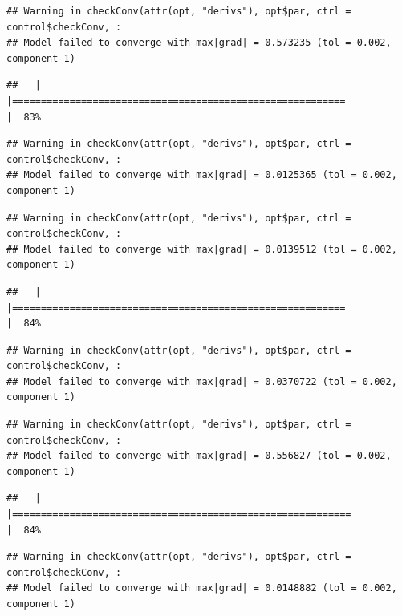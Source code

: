 \documentclass[
  12pt,
]{book}
\begin{document}
\begin{verbatim}
## Warning in checkConv(attr(opt, "derivs"), opt$par, ctrl = control$checkConv, :
## Model failed to converge with max|grad| = 0.573235 (tol = 0.002, component 1)
\end{verbatim}

\begin{verbatim}
##   |                                                                              |==========================================================            |  83%
\end{verbatim}

\begin{verbatim}
## Warning in checkConv(attr(opt, "derivs"), opt$par, ctrl = control$checkConv, :
## Model failed to converge with max|grad| = 0.0125365 (tol = 0.002, component 1)
\end{verbatim}

\begin{verbatim}
## Warning in checkConv(attr(opt, "derivs"), opt$par, ctrl = control$checkConv, :
## Model failed to converge with max|grad| = 0.0139512 (tol = 0.002, component 1)
\end{verbatim}

\begin{verbatim}
##   |                                                                              |==========================================================            |  84%
\end{verbatim}

\begin{verbatim}
## Warning in checkConv(attr(opt, "derivs"), opt$par, ctrl = control$checkConv, :
## Model failed to converge with max|grad| = 0.0370722 (tol = 0.002, component 1)
\end{verbatim}

\begin{verbatim}
## Warning in checkConv(attr(opt, "derivs"), opt$par, ctrl = control$checkConv, :
## Model failed to converge with max|grad| = 0.556827 (tol = 0.002, component 1)
\end{verbatim}

\begin{verbatim}
##   |                                                                              |===========================================================           |  84%
\end{verbatim}

\begin{verbatim}
## Warning in checkConv(attr(opt, "derivs"), opt$par, ctrl = control$checkConv, :
## Model failed to converge with max|grad| = 0.0148882 (tol = 0.002, component 1)
\end{verbatim}
\end{document}
